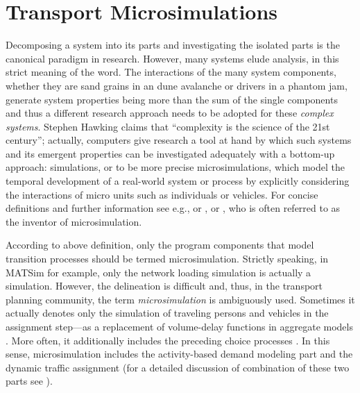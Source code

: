 \section{Transport Microsimulations}
\label{sec:transportmsims}
Decomposing a system into its parts and investigating the isolated parts is the canonical paradigm in research. However, many systems elude analysis, in this strict meaning of the word. The interactions of the many system components, whether they are sand grains in an dune avalanche or drivers in a phantom jam, generate system properties being more than the sum of the single components and thus a different research approach needs to be adopted for these \emph{complex systems}. Stephen Hawking claims that ``complexity is the science of the 21st century''; actually, computers give research a tool at hand by which such systems and its emergent properties can be investigated adequately with a bottom-up approach: simulations, or to be more precise microsimulations, which model the temporal development of a real-world system or process by explicitly considering the interactions of micro units such as individuals or vehicles. For concise definitions and further information see e.g., \citet[][Section 2]{Miller_ABTFC_1996} or \citet[][p.3]{Banks_2001}, \citet[][]{Bossel_2004} or \citet[][]{Orcutt_RESQ_1957}, who is often referred to as the inventor of microsimulation.

According to above definition, only the program components that model transition processes should be termed microsimulation. Strictly speaking, in MATSim for example, only the network loading simulation is actually a simulation. However, the delineation is difficult and, thus, in the transport planning community, the term \emph{microsimulation} is ambiguously used. Sometimes it actually denotes only the simulation of traveling persons and vehicles in the assignment step---as a replacement of volume-delay functions in aggregate models \citep[see e.g.,][p.508]{NagelBarrett_IJMPC_1997}. More often, it additionally includes the preceding choice processes \citep[][]{Kitamura_TMIP_1996, LiuEtAl_TransResA_2006}. In this sense, microsimulation includes the activity-based demand modeling part and the dynamic traffic assignment (for a detailed discussion of combination of these two parts see \citet[][p.10ff]{Balmer_PhDThesis_2007}).

